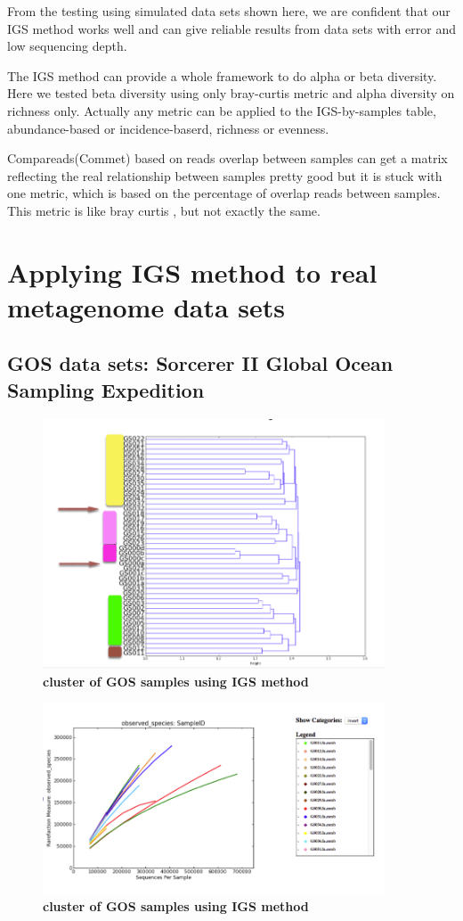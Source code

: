 From the testing using simulated data sets shown here, we are confident that our IGS method works well and can give reliable results from data sets with error and low sequencing depth.

The IGS method can provide a whole framework to do alpha or beta diversity. Here we tested beta diversity using only bray-curtis metric and alpha diversity on richness only. Actually any metric can be applied to the IGS-by-samples table, abundance-based or incidence-baserd, richness or evenness.

Compareads(Commet) based on reads overlap between samples can get a matrix reflecting the real relationship between samples pretty good but it is stuck with one metric, which is based on the percentage of overlap reads between samples. This metric is like bray curtis , but not exactly the same.



\section{Applying IGS method to real metagenome data sets}

\subsection{GOS data sets: Sorcerer II Global Ocean Sampling Expedition}



\begin{figure}[!ht]
 \centerline{\includegraphics[width=4in]{./figures/GOS_cluster.png}}
\caption{\bf cluster of GOS samples using IGS method}
\label{fig:concept}
\end{figure}

\begin{figure}[!ht]
 \centerline{\includegraphics[width=4in]{./figures/GOS_observed.png}}
\caption{\bf cluster of GOS samples using IGS method}
\label{fig:concept}
\end{figure}

